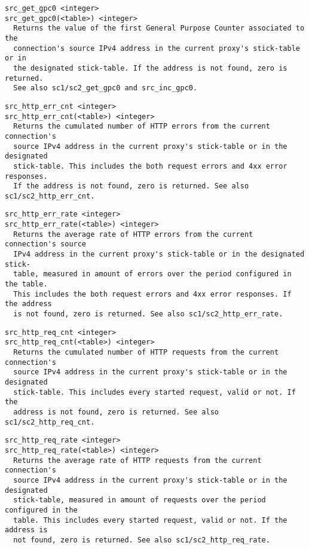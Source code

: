 \begin{verbatim}
src_get_gpc0 <integer>
src_get_gpc0(<table>) <integer>
  Returns the value of the first General Purpose Counter associated to the
  connection's source IPv4 address in the current proxy's stick-table or in
  the designated stick-table. If the address is not found, zero is returned.
  See also sc1/sc2_get_gpc0 and src_inc_gpc0.
\end{verbatim}

\begin{verbatim}
src_http_err_cnt <integer>
src_http_err_cnt(<table>) <integer>
  Returns the cumulated number of HTTP errors from the current connection's
  source IPv4 address in the current proxy's stick-table or in the designated
  stick-table. This includes the both request errors and 4xx error responses.
  If the address is not found, zero is returned. See also sc1/sc2_http_err_cnt.
\end{verbatim}

\begin{verbatim}
src_http_err_rate <integer>
src_http_err_rate(<table>) <integer>
  Returns the average rate of HTTP errors from the current connection's source
  IPv4 address in the current proxy's stick-table or in the designated stick-
  table, measured in amount of errors over the period configured in the table.
  This includes the both request errors and 4xx error responses. If the address
  is not found, zero is returned. See also sc1/sc2_http_err_rate.
\end{verbatim}

\begin{verbatim}
src_http_req_cnt <integer>
src_http_req_cnt(<table>) <integer>
  Returns the cumulated number of HTTP requests from the current connection's
  source IPv4 address in the current proxy's stick-table or in the designated
  stick-table. This includes every started request, valid or not. If the
  address is not found, zero is returned. See also sc1/sc2_http_req_cnt.
\end{verbatim}

\begin{verbatim}
src_http_req_rate <integer>
src_http_req_rate(<table>) <integer>
  Returns the average rate of HTTP requests from the current connection's
  source IPv4 address in the current proxy's stick-table or in the designated
  stick-table, measured in amount of requests over the period configured in the
  table. This includes every started request, valid or not. If the address is
  not found, zero is returned. See also sc1/sc2_http_req_rate.
\end{verbatim}

